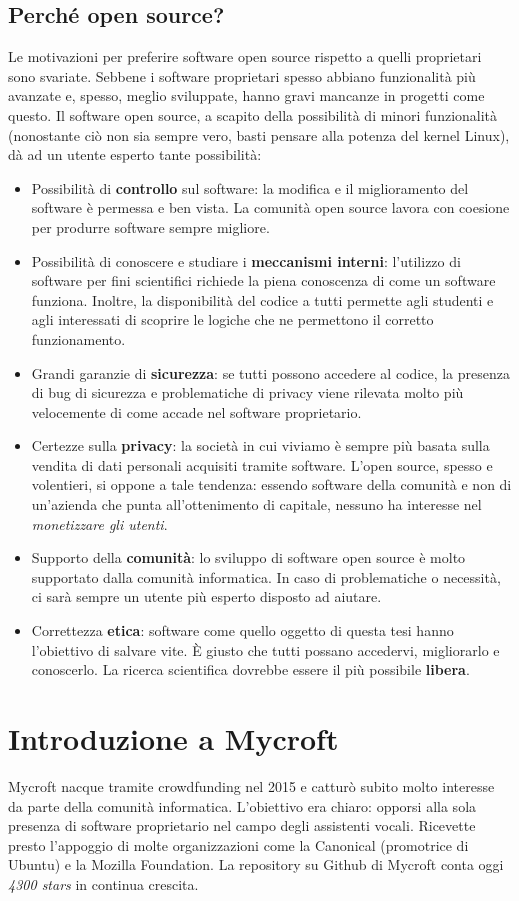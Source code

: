 \subsection{Perché open source?}
Le motivazioni per preferire software open source rispetto a quelli proprietari sono svariate. Sebbene i software proprietari spesso abbiano funzionalità più avanzate e, spesso, meglio sviluppate, hanno gravi mancanze in progetti come questo. Il software open source, a scapito della possibilità di minori funzionalità (nonostante ciò non sia sempre vero, basti pensare alla potenza del kernel Linux), dà ad un utente esperto tante possibilità:
\begin{itemize}
    \item Possibilità di \textbf{controllo} sul software: la modifica e il miglioramento del software è permessa e ben vista. La comunità open source lavora con coesione per produrre software sempre migliore.
    \item Possibilità di conoscere e studiare i \textbf{meccanismi interni}: l'utilizzo di software per fini scientifici richiede la piena conoscenza di come un software funziona. Inoltre, la disponibilità del codice a tutti permette agli studenti e agli interessati di scoprire le logiche che ne permettono il corretto funzionamento.
    \item Grandi garanzie di \textbf{sicurezza}: se tutti possono accedere al codice, la presenza di bug di sicurezza e problematiche di privacy viene rilevata molto più velocemente di come accade nel software proprietario.
    \item Certezze sulla \textbf{privacy}: la società in cui viviamo è sempre più basata sulla vendita di dati personali acquisiti tramite software. L'open source, spesso e volentieri, si oppone a tale tendenza: essendo software della comunità e non di un'azienda che punta all'ottenimento di capitale, nessuno ha interesse nel \textit{monetizzare gli utenti}.
    \item Supporto della \textbf{comunità}: lo sviluppo di software open source è molto supportato dalla comunità informatica. In caso di problematiche o necessità, ci sarà sempre un utente più esperto disposto ad aiutare.
    \item Correttezza \textbf{etica}: software come quello oggetto di questa tesi hanno l'obiettivo di salvare vite. È giusto che tutti possano accedervi, migliorarlo e conoscerlo. La ricerca scientifica dovrebbe essere il più possibile \textbf{libera}.
\end{itemize}
\section{Introduzione a Mycroft}
Mycroft nacque tramite crowdfunding nel 2015 e catturò subito molto interesse da parte della comunità informatica. L'obiettivo era chiaro: opporsi alla sola presenza di software proprietario nel campo degli assistenti vocali. Ricevette presto l'appoggio di molte organizzazioni come la Canonical (promotrice di Ubuntu) e la Mozilla Foundation. La repository su Github di Mycroft conta oggi \textit{4300 stars} in continua crescita.
